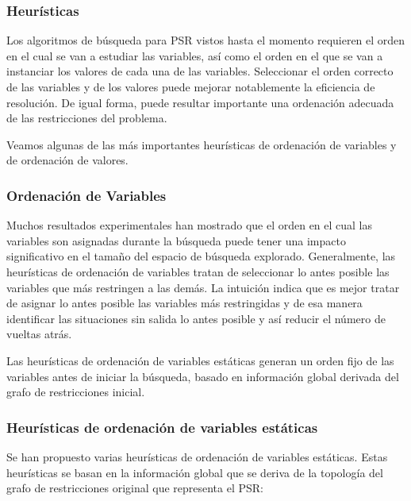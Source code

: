 \documentclass[a4paper]{article}
\begin{document}
\subsubsection{Heurísticas}
Los algoritmos de búsqueda para PSR vistos hasta el momento requieren el orden en el cual se van a estudiar las variables, así como el orden en el que se van a instanciar los valores de cada una de las variables. Seleccionar el orden correcto de las variables y de los valores puede mejorar notablemente la eficiencia de resolución. De igual forma, puede resultar importante una ordenación adecuada de las restricciones del problema.

Veamos algunas de las más importantes heurísticas de ordenación de variables y de ordenación de valores.\\

\subsubsection*{Ordenación de Variables}

Muchos resultados experimentales han mostrado que el orden en el cual las variables son asignadas durante la búsqueda puede tener una impacto significativo en el tamaño del espacio de búsqueda explorado. Generalmente, las heurísticas de ordenación de variables tratan de seleccionar lo antes posible las variables que más restringen a las demás. La intuición indica que es mejor tratar de asignar lo antes posible las variables más restringidas y de esa manera identificar las situaciones sin salida lo antes posible y así reducir el número de vueltas atrás.

Las heurísticas de ordenación de variables estáticas generan un orden fijo de las variables antes de iniciar la búsqueda, basado en información global derivada del grafo de restricciones inicial.

\subsubsection*{Heurísticas de ordenación de variables estáticas}
Se han propuesto varias heurísticas de ordenación de variables estáticas. Estas heurísticas se basan en la información global que se deriva de la topología del grafo de restricciones original que representa el PSR:
\end{document}
